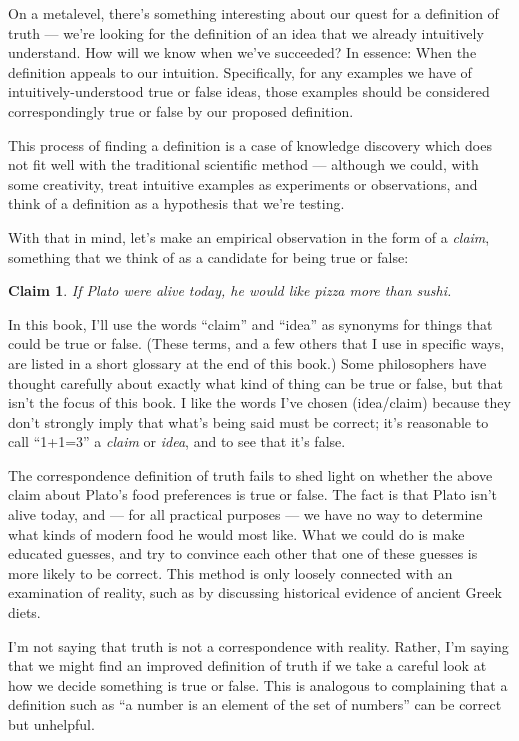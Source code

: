 \documentclass[9pt, twoside]{book}
\newtheorem*{claim}{Claim}
\theoremstyle{argtstyle}
\begin{document}
On a metalevel, there's something interesting about our quest for a definition
of truth --- we're
looking for the definition of an idea that we already intuitively understand.
How will we know when we've succeeded?
In essence: When the definition
appeals to our intuition.
Specifically, for any examples we have of intuitively-understood true or false
ideas, those examples should be considered correspondingly true or false by our
proposed definition.

This process of finding a definition is a case of
knowledge discovery which does not fit well with the traditional scientific
method --- although we could, with some creativity, treat
intuitive examples as
experiments or observations, and think of a definition as a hypothesis that
we're testing.

With that in mind, let's make an
empirical observation in the form of a
{\em claim}, something that we think of as a candidate for
being true or false:
\begin{claim}\label{c1}
    If Plato were alive today, he would like pizza more than sushi.
\end{claim}
In this book, I'll use the words ``claim'' and ``idea'' as
synonyms for things that could be true or false.
(These terms, and a few others that I use in specific ways,
are listed in a short glossary at the end of this book.)
Some philosophers have thought
carefully about exactly what kind of thing can be true or false, but that isn't
the focus of this book.
I like the words I've chosen (idea/claim) because they don't
strongly imply that what's being said must be correct; it's reasonable to
call ``1+1=3'' a {\em claim} or {\em idea}, and to see that it's false.

The correspondence definition of truth fails to shed light
on whether the above claim about Plato's food preferences
is true or false.
The fact is that Plato isn't alive today, and --- for all practical purposes
--- we have no way to determine what kinds of modern food he would most like.
What we could do is make educated guesses, and try to convince each other
that one of these guesses is more likely to be correct.
This method is only loosely connected with an examination of reality, such as by
discussing historical evidence of ancient Greek diets.

I'm not saying that truth is not a correspondence
with reality.
Rather, I'm saying that we might find an improved definition of truth if we take
a careful look at how we decide something is true or false.
This is analogous to complaining that a definition such as ``a number is an
element of the set of numbers'' can be correct but unhelpful.
\end{document}
